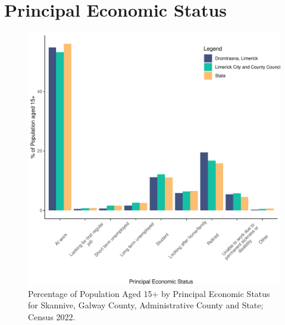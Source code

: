 \documentclass{article}
\begin{document}
  
\pagebreak
\section{Principal Economic Status}\label{sect:PES}
\begin{figure}[H]
	\centering
	\includegraphics[width = 140mm]{../figures/PESED.pdf}
	\caption{Percentage of Population Aged 15+ by Principal Economic Status for Skannive, Galway County, Administrative County and State; Census 2022.}
	\label{fig:vbnv}
	\end{figure}
\end{document}
